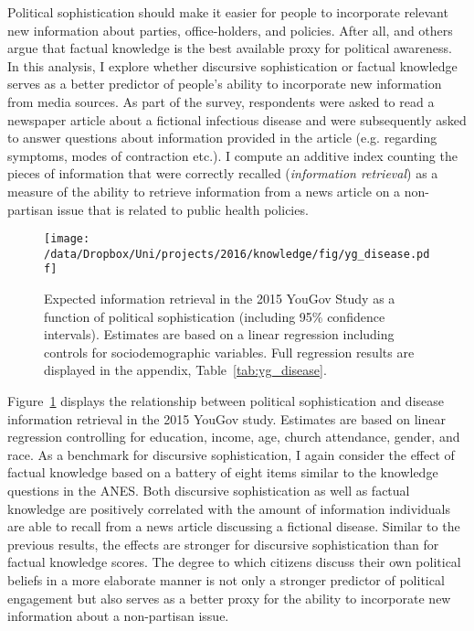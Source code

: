 Political sophistication should make it easier for people to incorporate relevant new information about parties, office-holders, and policies. After all,  \citet{zaller1990political,zaller1992nature} and others argue that factual knowledge is the best available proxy for political awareness. In this analysis, I explore whether discursive sophistication or factual knowledge serves as a better predictor of people's ability to incorporate new information from media sources. As part of the survey, respondents were asked to read a newspaper article about a fictional infectious disease and were subsequently asked to answer questions about information provided in the article (e.g. regarding symptoms, modes of contraction etc.). I compute an additive index counting the pieces of information that were correctly recalled (\textit{information retrieval}) as a measure of the ability to retrieve information from a news article on a non-partisan issue that is related to public health policies. 

\begin{figure}[h]\centering
\texttt{[image: /data/Dropbox/Uni/projects/2016/knowledge/fig/yg\_disease.pdf]}
\caption[Expected information retrieval in the 2015 YouGov Study as a function of political sophistication]{Expected information retrieval in the 2015 YouGov Study as a function of political sophistication (including 95\% confidence intervals). Estimates are based on a linear regression including controls for sociodemographic variables. Full regression results are displayed in the appendix, Table~\ref{tab:yg_disease}.}\label{fig:yg_disease}
\end{figure}

Figure~\ref{fig:yg_disease} displays the relationship between political sophistication and disease information retrieval in the 2015 YouGov study. Estimates are based on linear regression controlling for education, income, age, church attendance, gender, and race. As a benchmark for discursive sophistication, I again consider the effect of factual knowledge based on a battery of eight items similar to the knowledge questions in the ANES. Both discursive sophistication as well as factual knowledge are positively correlated with the amount of information individuals are able to recall from a news article discussing a fictional disease. Similar to the previous results, the effects are stronger for discursive sophistication than for factual knowledge scores. The degree to which citizens discuss their own political beliefs in a more elaborate manner is not only a stronger predictor of political engagement but also serves as a better proxy for the ability to incorporate new information about a non-partisan issue.


